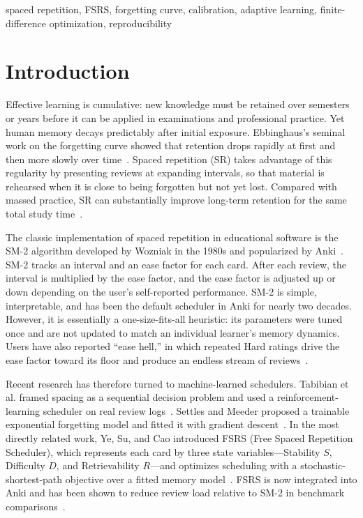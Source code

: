\documentclass[conference]{IEEEtran}
\begin{document}
\begin{IEEEkeywords}
spaced repetition, FSRS, forgetting curve, calibration, adaptive learning, finite-difference optimization, reproducibility
\end{IEEEkeywords}

\section{Introduction}

Effective learning is cumulative: new knowledge must be retained over semesters or years before it can be applied in examinations and professional practice. Yet human memory decays predictably after initial exposure. Ebbinghaus's seminal work on the forgetting curve showed that retention drops rapidly at first and then more slowly over time~\cite{ebbinghaus1885}. Spaced repetition (SR) takes advantage of this regularity by presenting reviews at expanding intervals, so that material is rehearsed when it is close to being forgotten but not yet lost. Compared with massed practice, SR can substantially improve long-term retention for the same total study time~\cite{roediger2006testing}.

The classic implementation of spaced repetition in educational software is the SM-2 algorithm developed by Wozniak in the 1980s and popularized by Anki~\cite{wozniak1990sm2}. SM-2 tracks an interval and an ease factor for each card. After each review, the interval is multiplied by the ease factor, and the ease factor is adjusted up or down depending on the user's self-reported performance. SM-2 is simple, interpretable, and has been the default scheduler in Anki for nearly two decades. However, it is essentially a one-size-fits-all heuristic: its parameters were tuned once and are not updated to match an individual learner's memory dynamics. Users have also reported ``ease hell,'' in which repeated Hard ratings drive the ease factor toward its floor and produce an endless stream of reviews~\cite{matuschak2020easehell}.

Recent research has therefore turned to machine-learned schedulers. Tabibian et al. framed spacing as a sequential decision problem and used a reinforcement-learning scheduler on real review logs~\cite{tabibian2019optimizing}. Settles and Meeder proposed a trainable exponential forgetting model and fitted it with gradient descent~\cite{settles2016trainable}. In the most directly related work, Ye, Su, and Cao introduced FSRS (Free Spaced Repetition Scheduler), which represents each card by three state variables---Stability $S$, Difficulty $D$, and Retrievability $R$---and optimizes scheduling with a stochastic-shortest-path objective over a fitted memory model~\cite{ye2022fsrs}. FSRS is now integrated into Anki and has been shown to reduce review load relative to SM-2 in benchmark comparisons~\cite{su2024tkde}.
\end{document}
